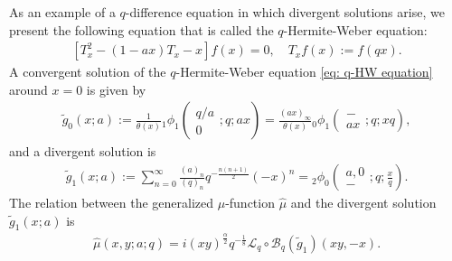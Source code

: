 \documentclass[a4paper]{article}
\newcommand{\hyper}[4]{\left( \begin{matrix} #1 \\ #2 \end{matrix};#3;#4\right)}
\numberwithin{equation}{section}
\theoremstyle{plain}
\begin{document}
As an example of a $q$-difference equation in which divergent solutions arise, we present the following equation that is called the $q$-Hermite-Weber equation: 
\begin{align}
\label{eq: q-HW equation}
\left[T_x^2-(1-a x)T_x-x\right]f(x)=0,\quad T_xf(x):=f(q x). 
\end{align}
A convergent solution of the $q$-Hermite-Weber equation \eqref{eq: q-HW equation} around $x=0$ is given by 
\begin{align*}
\widetilde{g}_0(x;a):=\frac{1}{\theta(x)}{}_1\phi_1\hyper{q/a}{0}{q}{ax}=\frac{(ax)_\infty}{\theta(x)}{}_0\phi_1\hyper{-}{ax}{q}{xq}, 
\end{align*}
and a divergent solution is
\begin{align*}
\widetilde{g}_1(x;a):=\sum_{n=0}^\infty \frac{(a)_n}{(q)_n}q^{-\frac{n(n+1)}{2}}(-x)^n={}_2\phi_0\hyper{a,0}{-}{q}{\frac{x}{q}}. 
\end{align*}
The relation between the generalized $\mu$-function $\widehat{\mu}$ and the divergent solution $\widetilde{g}_1(x;a)$ is 
\begin{align*}
\widehat{\mu}(x,y;a;q)=i(xy)^\frac{\alpha}{2}q^{-\frac{1}{8}}\mathcal{L}_q\circ\mathcal{B}_q\left(\widetilde{g}_1\right)(xy,-x). 
\end{align*}
\end{document}
